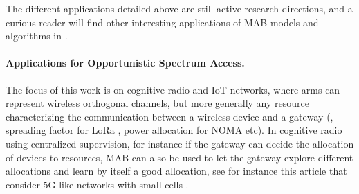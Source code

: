 

The different applications detailed above are still active research directions,
and a curious reader will find other interesting applications of MAB models and algorithms in \cite{bouneffouf2019survey}.


\paragraph{Applications for Opportunistic Spectrum Access.}

The focus of this work is on cognitive radio and IoT networks, where arms can represent wireless orthogonal channels, but more generally any resource characterizing the communication between a wireless device and a gateway (\eg, spreading factor for LoRa \cite{KerkoucheAlami18}, power allocation for NOMA etc). In cognitive radio using centralized supervision, for instance if the gateway can decide the allocation of devices to resources, MAB can also be used to let the gateway explore different allocations and learn by itself a good allocation, see for instance this article that consider 5G-like networks with small cells \cite{Maghsudi16}.

